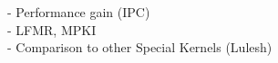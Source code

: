 -	Performance gain (IPC) \\
-	LFMR, MPKI \\
-	Comparison to other Special Kernels (Lulesh)






%
%
%
%  
%
%
%
%








